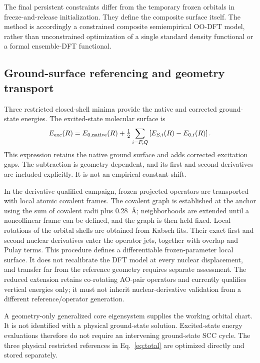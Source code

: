 \documentclass[11pt,a4paper]{article}
\begin{document}
The final persistent constraints differ from the temporary frozen orbitals in freeze-and-release initialization.\cite{freeze2026} They define the composite surface itself. The method is accordingly a constrained composite semiempirical OO-DFT model, rather than unconstrained optimization of a single standard density functional or a formal ensemble-DFT functional.

\subsection{Ground-surface referencing and geometry transport}
Three restricted closed-shell minima provide the native and corrected ground-state energies. The excited-state molecular surface is
\begin{equation}
 E_{\rm exc}(R)=E_{0,\rm native}(R)
 +\tfrac12\sum_{i=F,Q}\left[E_{S,i}(R)-E_{0,i}(R)\right].\label{eq:total}
\end{equation}
This expression retains the native ground surface and adds corrected excitation gaps. The subtraction is geometry dependent, and its first and second derivatives are included explicitly. It is not an empirical constant shift.

In the derivative-qualified campaign, frozen projected operators are transported with local atomic covalent frames. The covalent graph is established at the anchor using the sum of covalent radii plus 0.28~\AA; neighborhoods are extended until a noncollinear frame can be defined, and the graph is then held fixed. Local rotations of the orbital shells are obtained from Kabsch fits. Their exact first and second nuclear derivatives enter the operator jets, together with overlap and Pulay terms. This procedure defines a differentiable frozen-parameter local surface. It does not recalibrate the DFT model at every nuclear displacement, and transfer far from the reference geometry requires separate assessment. The reduced extension retains co-rotating AO-pair operators and currently qualifies vertical energies only; it must not inherit nuclear-derivative validation from a different reference/operator generation.

A geometry-only generalized core eigensystem supplies the working orbital chart. It is not identified with a physical ground-state solution. Excited-state energy evaluations therefore do not require an intervening ground-state SCC cycle. The three physical restricted references in Eq.~\eqref{eq:total} are optimized directly and stored separately.
\end{document}
